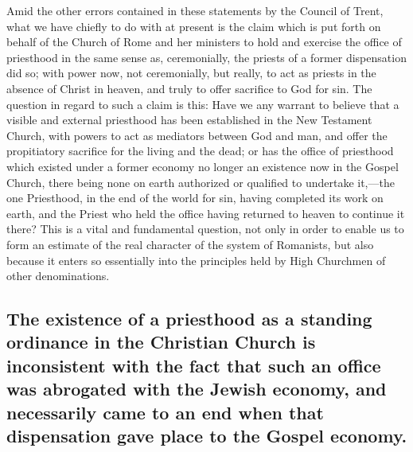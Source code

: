 \documentclass[english,]{book}
\begin{document}
Amid the other errors contained in these statements by the Council of Trent, what we have chiefly to do with at present is the claim which is put forth on behalf of the Church of Rome and her ministers to hold and exercise the office of priesthood in the same sense as, ceremonially, the priests of a former dispensation did so; with power now, not ceremonially, but really, to act as priests in the absence of Christ in heaven, and truly to offer sacrifice to God for sin. The question in regard to such a claim is this: Have we any warrant to believe that a visible and external priesthood has been established in the New Testament Church, with powers to act as mediators between God and man, and offer the propitiatory sacrifice for the living and the dead; or has the office of priesthood which existed under a former economy no longer an existence now in the Gospel Church, there being none on earth authorized or qualified to undertake it,---the one Priesthood, in the end of the world for sin, having completed its work on earth, and the Priest who held the office having returned to heaven to continue it there? This is a vital and fundamental question, not only in order to enable us to form an estimate of the real character of the system of Romanists, but also because it enters so essentially into the principles held by High Churchmen of other denominations.

\hypertarget{the-existence-of-a-priesthood-as-a-standing-ordinance-in-the-christian-church-is-inconsistent-with-the-fact-that-such-an-office-was-abrogated-with-the-jewish-economy-and-necessarily-came-to-an-end-when-that-dispensation-gave-place-to-the-gospel-economy.}{%
\subsection{The existence of a priesthood as a standing ordinance in the Christian Church is inconsistent with the fact that such an office was abrogated with the Jewish economy, and necessarily came to an end when that dispensation gave place to the Gospel economy.}\label{the-existence-of-a-priesthood-as-a-standing-ordinance-in-the-christian-church-is-inconsistent-with-the-fact-that-such-an-office-was-abrogated-with-the-jewish-economy-and-necessarily-came-to-an-end-when-that-dispensation-gave-place-to-the-gospel-economy.}}
\end{document}
